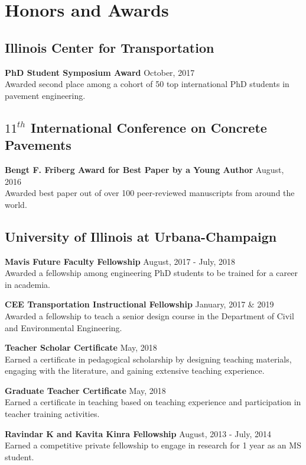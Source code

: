 \documentclass[12pt]{article}
\begin{document}
\bigskip
\section*{Honors and Awards}
\subsection*{Illinois Center for Transportation}
\textbf{PhD Student Symposium Award} \hfill October, 2017 \\
Awarded second place among a cohort of 50 top international PhD students in pavement engineering.

\subsection*{$11^{th}$ International Conference on Concrete Pavements}
\textbf{Bengt F. Friberg Award for Best Paper by a Young Author} \hfill August, 2016  \\
Awarded best paper out of over 100 peer-reviewed manuscripts from around the world.

\subsection*{University of Illinois at Urbana-Champaign} 
\textbf{Mavis Future Faculty Fellowship} \hfill August, 2017 - July, 2018 \\
Awarded a fellowship among engineering PhD students to be trained for a career in academia.

\textbf{CEE Transportation Instructional Fellowship} \hfill January, 2017 \& 2019 \\
Awarded a fellowship to teach a senior design course in the Department of Civil and Environmental Engineering.

\textbf{Teacher Scholar Certificate} \hfill May, 2018 \\
Earned a certificate in pedagogical scholarship by designing teaching materials, engaging with the literature, and gaining extensive teaching experience.

\textbf{Graduate Teacher Certificate} \hfill May, 2018 \\
Earned a certificate in teaching based on teaching experience and participation in teacher training activities.

\textbf{Ravindar K and Kavita Kinra Fellowship} \hfill August, 2013 - July, 2014 \\
Earned a competitive private fellowship to engage in research for 1 year as an MS student.
\end{document}
